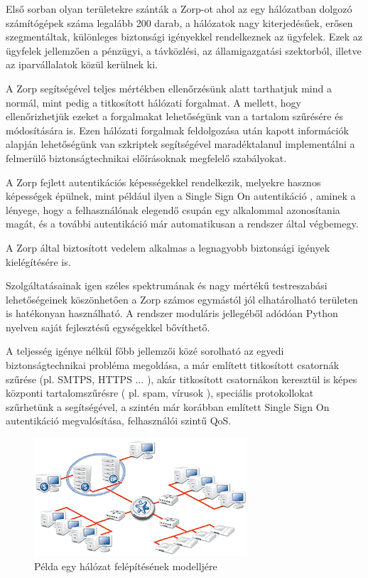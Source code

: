 \documentclass[a4paper,12pt,oneside]{report}
\begin{document}
Első sorban olyan területekre szánták a Zorp-ot ahol az egy hálózatban dolgozó számítógépek száma legalább 200 darab, a hálózatok nagy kiterjedésűek, erősen szegmentáltak, különleges biztonsági igényekkel rendelkeznek az ügyfelek.
Ezek az ügyfelek jellemzően a pénzügyi, a távközlési, az államigazgatási szektorból, illetve az iparvállalatok közül kerülnek ki.

A Zorp segítségével teljes mértékben ellenőrzésünk alatt tarthatjuk mind a normál, mint pedig a titkosított hálózati forgalmat.
A mellett, hogy ellenőrizhetjük ezeket a forgalmakat lehetőségünk van a tartalom szűrésére és módosítására is.
Ezen hálózati forgalmak feldolgozása után kapott információk alapján lehetőségünk van szkriptek segítségével maradéktalanul implementálni a felmerülő biztonságtechnikai előírásoknak megfelelő szabályokat.

A Zorp fejlett autentikációs képességekkel rendelkezik, melyekre hasznos képességek épülnek, mint például ilyen a Single Sign On autentikáció \cite{website:sso} , aminek a lényege, hogy a felhasználónak elegendő csupán egy alkalommal azonosítania magát, és a további autentikáció már automatikusan a rendszer által végbemegy.

A Zorp által biztosított vedelem alkalmas a legnagyobb biztonsági igények kielégítésére is.

Szolgáltatásainak igen széles spektrumának és nagy mértékű testreszabási lehetőségeinek köszönhetően a Zorp számos egymástól jól elhatárolható területen is hatékonyan használható.
A rendszer moduláris jellegéből adódóan Python nyelven saját fejlesztésű egységekkel bővíthető.

A teljesség igénye nélkül főbb jellemzői közé sorolható az egyedi biztonságtechnikai probléma megoldása, a már említett titkosított csatornák szűrése (pl. SMTPS, HTTPS ... ), akár titkosított csatornákon keresztül is képes központi tartalomszűrésre ( pl. spam, vírusok ), speciális protokollokat szűrhetünk a segítségével, a szintén már korábban említett Single Sign On autentikáció megvalósítása, felhasználói szintű QoS.

\begin{figure}[h]
  \includegraphics{zorp.png}
  \caption{Példa egy hálózat felépítésének modelljére}
  \label{fig:zorp}
\end{figure}
\end{document}
